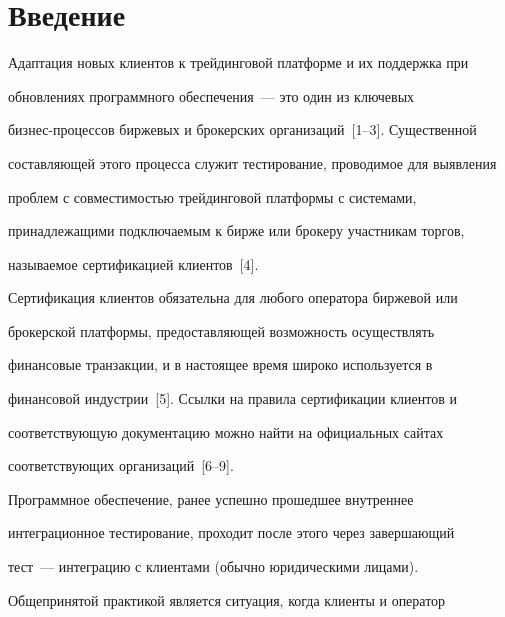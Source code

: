 







      \thispagestyle{headings}





\section{Введение}





Адаптация новых клиентов к трейдинговой платформе и их поддержка при


обновлениях программного обеспечения~--- это один из ключевых


биз\-нес-про\-цес\-сов биржевых и брокерских организаций~[1--3]. Существенной


составляющей этого процесса служит тестирование, проводимое для выявления


проблем с совместимостью трейдинговой платформы с системами,


принадлежащими подключаемым к бирже или брокеру участникам торгов,


называемое сертификацией клиентов~[4].





Сертификация клиентов обязательна для любого оператора биржевой или


брокерской платформы, предоставляющей возможность осуществлять


финансовые транзакции, и в настоящее время широко используется в


финансовой индустрии~[5]. Ссылки на правила сертификации клиентов и


соответствующую документацию можно найти на официальных сайтах


соответствующих организаций~[6--9].





Программное обеспечение, ранее успешно прошедшее внутреннее


интеграционное тестирование, проходит после этого через завершающий


тест~--- интеграцию с клиентами (обычно юридическими лицами).


Общепринятой практикой является ситуация, когда клиенты и оператор


